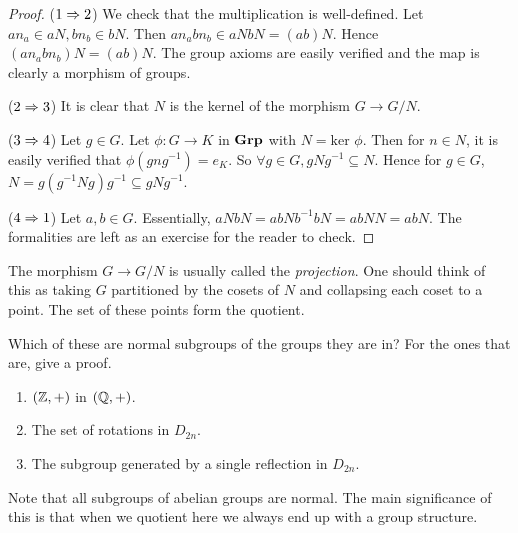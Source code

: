 \documentclass[../../book.tex]{subfiles}
\begin{document}
\begin{proof}
    ($1 \Rightarrow 2$) 
        We check that the multiplication is well-defined. 
        Let $an_a \in aN, bn_b \in bN$. 
        Then $an_abn_b \in aNbN = (ab)N$. 
        Hence $(an_abn_b)N = (ab)N$.
        The group axioms are easily verified
        and the map is clearly a morphism of groups.
        
    ($2 \Rightarrow 3$)
        It is clear that $N$ is the kernel of the morphism
        $G \to G/N$.
        
    ($3 \Rightarrow 4$)
        Let $g \in G$. 
        Let $\phi : G \to K$ in $\mathbf{Grp}$ with $N = \text{ker }\phi$.
        Then for $n \in N$, it is easily verified that $\phi(gng^{-1}) = e_K$. 
        So $\forall g \in G, gNg^{-1} \subseteq N$. 
        Hence for $g \in G$, $N = g(g^{-1}Ng)g^{-1} \subseteq gNg^{-1}$.
        
    ($4 \Rightarrow 1$)
        Let $a, b \in G$. 
        Essentially, $aNbN = abNb^{-1}bN = abNN = abN$. 
        The formalities are left as an exercise for the reader to check. 
        
\end{proof}

\begin{rmk}
    The morphism $G \to G/N$ is usually called the \emph{projection}. 
    One should think of this as taking $G$ partitioned by the cosets of $N$
    and collapsing each coset to a point. 
    The set of these points form the quotient. 
\end{rmk}

\begin{ex}
    
    Which of these are normal subgroups of the groups they are in? 
    For the ones that are, give a proof.
    \begin{enumerate}
        \item $(\mathbb{Z},+)$ in $(\mathbb{Q},+)$.
        \item The set of rotations in $D_{2n}$.
        \item The subgroup generated by a single reflection in $D_{2n}$.
        
    \end{enumerate}
    
\end{ex}

\begin{rmk}
    Note that all subgroups of abelian groups are normal. 
    The main significance of this is that 
    when we quotient here we always end up with a group structure.
\end{rmk}
\end{document}
